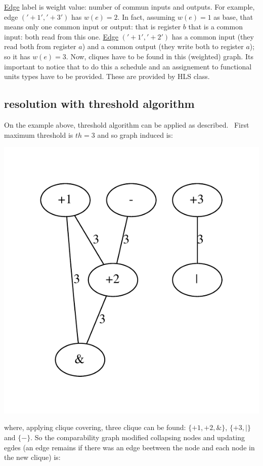  \hyperlink{structEdge}{Edge} label is weight value\+: number of commun inputs and outputs. For example, edge $ ('+1','+3') $ has $ w(e)=2 $. In fact, assuming $ w(e)=1 $ as base, that means only one common input or output\+: that is register $ b $ that is a common input\+: both read from this one. \hyperlink{structEdge}{Edge} $ ('+1','+2') $ has a common input (they read both from register $ a $) and a common output (they write both to register $ a $); so it has $ w(e)=3 $. Now, cliques have to be found in this (weighted) graph. It\textquotesingle{}s important to notice that to do this a schedule and an assignement to functional units types have to be provided. These are provided by H\+LS class.\hypertarget{src_HLS_module_binding_page_example_threshold}{}\subsection{resolution with threshold algorithm}\label{src_HLS_module_binding_page_example_threshold}
On the example above, threshold algorithm can be applied as described.~\newline
 First maximum threshold is $ th=3 $ and so graph induced is\+: 
\begin{DoxyImageNoCaption}
  \mbox{\includegraphics[width=\textwidth,height=\textheight/2,keepaspectratio=true]{dot_inline_dotgraph_14}}
\end{DoxyImageNoCaption}
 where, applying clique covering, three clique can be found\+: $ \lbrace +1,+2,\& \rbrace $, $ \lbrace +3,| \rbrace $ and $ \lbrace - \rbrace $. So the comparability graph modified collapsing nodes and updating egdes (an edge remains if there was an edge beetween the node and each node in the new clique) is\+:~\newline

